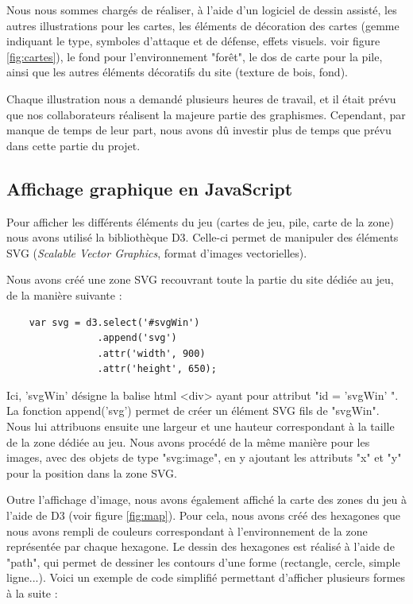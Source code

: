 \documentclass[12pt]{report}
\begin{document}
    Nous nous sommes chargés de réaliser, à l'aide d'un logiciel de dessin assisté, les autres illustrations pour les cartes, les éléments de décoration des cartes (gemme indiquant le type, symboles d'attaque et de défense, effets visuels. voir figure \ref{fig:cartes}), le fond pour l'environnement "forêt", le dos de carte pour la pile, ainsi que les autres éléments décoratifs du site (texture de bois, fond).

    Chaque illustration nous a demandé plusieurs heures de travail, et il était prévu que nos collaborateurs réalisent la majeure partie des graphismes. Cependant, par manque de temps de leur part, nous avons dû investir plus de temps que prévu dans cette partie du projet.

    \subsection{Affichage graphique en JavaScript}
		Pour afficher les différents éléments du jeu (cartes de jeu, pile, carte de la zone) nous avons utilisé la bibliothèque D3. Celle-ci permet de manipuler des éléments SVG (\textit{Scalable Vector Graphics}, format d'images vectorielles).

    Nous avons créé une zone SVG recouvrant toute la partie du site dédiée au jeu, de la manière suivante :

    \begin{verbatim}
    var svg = d3.select('#svgWin')
                .append('svg')
                .attr('width', 900)
                .attr('height', 650);
    \end{verbatim}

    Ici, 'svgWin' désigne la balise html \textless{}div\textgreater{} ayant pour attribut "id = 'svgWin' ". La fonction append('svg') permet de créer un élément SVG fils de "svgWin". Nous lui attribuons ensuite une largeur et une hauteur correspondant à la taille de la zone dédiée au jeu. Nous avons procédé de la même manière pour les images, avec des objets de type "svg:image", en y ajoutant les attributs "x" et "y" pour la position dans la zone SVG.

    Outre l'affichage d'image, nous avons également affiché la carte des zones du jeu à l'aide de D3 (voir figure \ref{fig:map}). Pour cela, nous avons créé des hexagones que nous avons rempli de couleurs correspondant à l'environnement de la zone représentée par chaque hexagone. Le dessin des hexagones est réalisé à l'aide de "path", qui permet de dessiner les contours d'une forme (rectangle, cercle, simple ligne...). Voici un exemple de code simplifié permettant d'afficher plusieurs formes à la suite :
\end{document}
